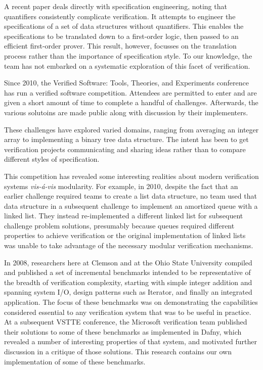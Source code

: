 A recent paper\cite{bouillaguetJahobFirstOrder} deals directly with specification engineering, noting that quantifiers consistently complicate verification.  It attempts to engineer the specifications of a set of data structures without quantifiers.  This enables the specifications to be translated down to a first-order logic, then passed to an efficient first-order prover.  This result, however, focusses on the translation process rather than the importance of specification style.  To our knowledge, the team has not embarked on a systematic exploration of this facet of verification.

Since 2010, the Verified Software: Tools, Theories, and Experiments conference has run a verified software competition.  Attendees are permitted to enter and are given a short amount of time to complete a handful of challenges.  Afterwards, the various solutoins are made public along with discussion by their implementers.

These challenges have explored varied domains, ranging from averaging an integer array to implementing a binary tree data structure.  The intent has been to get verification projects communicating and sharing ideas rather than to compare different styles of specification.  

This competition has revealed some interesting realities about modern verification systems \emph{vis-\'{a}-vis} modularity.  For example, in 2010, despite the fact that an earlier challenge required teams to create a list data structure, no team used that data structure in a subsequent challenge to implement an amortized queue with a linked list.  They instead re-implemented a different linked list for subsequent challenge problem solutions, presumably because queues required different properties to achieve verification or the original implementation of linked lists was unable to take advantage of the necessary modular verification mechanisms.

In 2008, researchers here at Clemson and at the Ohio State University compiled and published\cite{Benchmarks} a set of incremental benchmarks intended to be representative of the breadth of verification complexity, starting with simple integer addition and spanning system I/O, design patterns such as Iterator, and finally an integrated application.  The focus of these benchmarks was on demonstrating the capabilities considered essential to any verification system that was to be useful in practice.  At a subsequent VSTTE conference, the Microsoft verification team published their solutions to some of these benchmarks as implemented in Dafny\cite{DafnySolutions}, which revealed a number of interesting properties of that system, and motivated further discussion in a critique of those solutions\cite{bronish2010review}.  This research contains our own implementation of some of these benchmarks.
